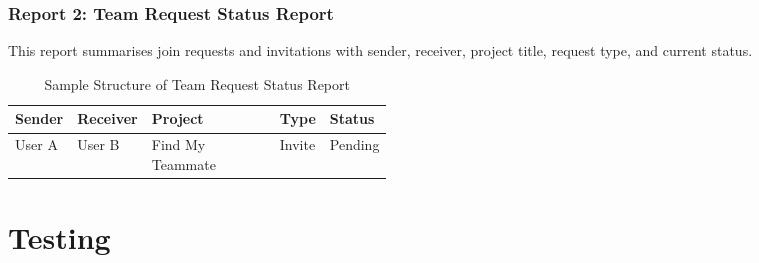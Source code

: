 \documentclass[12pt,a4paper,oneside]{report}
\begin{document}
\subsection{Report 2: Team Request Status Report}
This report summarises join requests and invitations with sender, receiver, project title, request type, and current status.

\begin{table}[H]
\centering
\caption{Sample Structure of Team Request Status Report}
{\small
\setlength{\tabcolsep}{4pt}
\begin{tabularx}{\textwidth}{@{} >{\raggedright\arraybackslash}p{0.12\linewidth} >{\raggedright\arraybackslash}p{0.12\linewidth} X >{\centering\arraybackslash}p{0.1\linewidth} >{\centering\arraybackslash}p{0.1\linewidth} @{}}
\toprule
\textbf{Sender} & \textbf{Receiver} & \textbf{Project} & \textbf{Type} & \textbf{Status} \\
\midrule
User A & User B & Find My Teammate & Invite & Pending \\
\bottomrule
\end{tabularx}
}
\end{table}

\chapter{Testing}
\end{document}
